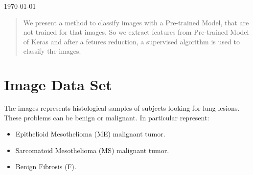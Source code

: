 \documentclass[12pt]{article} %
\begin{document}
\begin{titlepage}
{\large \today}\\[3cm] %


\vfill %

\end{titlepage}


\tableofcontents %

\newpage %

\begin{abstract}
We present a method to classify images with a Pre-trained Model, that are not trained for that images.
So we extract features from Pre-trained Model of Keras and after a fetures reduction, a supervised algorithm is used to classify the images. 
\end{abstract}
\newpage
\section{Image Data Set}
The images represents histological samples of subjects looking for lung lesions. These problems can be benign or malignant.
In particular represent:
\begin{itemize}
\item Epithelioid Mesothelioma (ME)  malignant tumor.
\item Sarcomatoid Mesothelioma (MS)  malignant tumor.
\item Benign Fibrosis (F).
\end{itemize}

\begin{figure}[H] %
 \end{figure}
\end{document}
